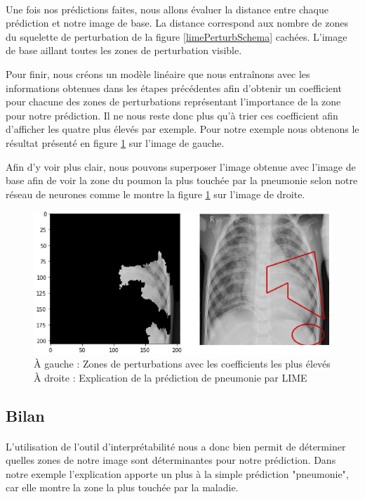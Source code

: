 \paragraph{}Une fois nos prédictions faites, nous allons évaluer la distance entre chaque prédiction et notre image de base. La distance correspond aux nombre de zones du squelette de perturbation de la figure \ref{limePerturbSchema} cachées. L'image de base aillant toutes les zones de perturbation visible.\par
Pour finir, nous créons un modèle linéaire que nous entraînons avec les informations obtenues dans les étapes précédentes afin d'obtenir un coefficient pour chacune des zones de perturbations représentant l'importance de la zone pour notre prédiction. Il ne nous reste donc plus qu'à trier ces coefficient afin d'afficher les quatre plus élevés par exemple. Pour notre exemple nous obtenons le résultat présenté en figure \ref{limeFinalExplain} sur l'image de gauche.

Afin d'y voir plus clair, nous pouvons superposer l'image obtenue avec l'image de base afin de voir la zone du poumon la plus touchée par la pneumonie selon notre réseau de neurones comme le montre la figure \ref{limeFinalExplain} sur l'image de droite.

\begin{figure}[h]
    \includegraphics[scale=0.58]{src_img/limeFinalExplainMerge.png}
    \caption{À gauche : Zones de perturbations avec les coefficients les plus élevés
    À droite : Explication de la prédiction de pneumonie par LIME}
    \label{limeFinalExplain}
\end{figure}
\subsection{Bilan}

\paragraph{}L'utilisation de l'outil d'interprétabilité nous a donc bien permit de déterminer quelles zones de notre image sont déterminantes pour notre prédiction. Dans notre exemple l'explication apporte un plus à la simple prédiction "pneumonie", car elle montre la zone la plus touchée par la maladie.

